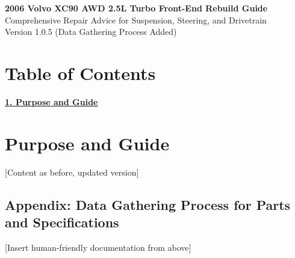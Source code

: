 \documentclass[a4paper,12pt]{article}
\begin{document}
\pagestyle{fancy}
\fancyhf{}
\renewcommand{\headrulewidth}{0.4pt}

\begin{center}
    {\Large\bfseries 2006 Volvo XC90 AWD 2.5L Turbo Front-End Rebuild Guide} \\
    {\large Comprehensive Repair Advice for Suspension, Steering, and Drivetrain} \\
    \vspace{0.5cm}
    Version 1.0.5 (Data Gathering Process Added)
\end{center}

\section*{Table of Contents}
\hyperref[sec:purpose]{\textbf{1. Purpose and Guide}} 

\section{Purpose and Guide}\label{sec:purpose}
[Content as before, updated version]

\subsection{Appendix: Data Gathering Process for Parts and Specifications}
[Insert human-friendly documentation from above]
\end{document}
